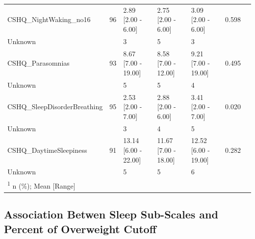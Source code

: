 \documentclass[
]{article}
\begin{document}
\begin{table}[!h]
\begin{tabular}[t]{lllllll}
CSHQ\_NightWaking\_no16 & 96 & 2.89 [2.00 - 6.00] & 2.75 [2.00 - 6.00] & 3.09 [2.00 - 6.00] & 0.598 & \\
\hspace{1em}Unknown &  & 3 & 5 & 3 &  & \\
CSHQ\_Parasomnias & 93 & 8.67 [7.00 - 19.00] & 8.58 [7.00 - 12.00] & 9.21 [7.00 - 19.00] & 0.495 & \\
\addlinespace
\hspace{1em}Unknown &  & 5 & 5 & 4 &  & \\
CSHQ\_SleepDisorderBreathing & 95 & 2.53 [2.00 - 7.00] & 2.88 [2.00 - 6.00] & 3.41 [2.00 - 7.00] & 0.020 & \\
\hspace{1em}Unknown &  & 3 & 4 & 5 &  & \\
CSHQ\_DaytimeSleepiness & 91 & 13.14 [6.00 - 22.00] & 11.67 [7.00 - 18.00] & 12.52 [6.00 - 19.00] & 0.282 & \\
\hspace{1em}Unknown &  & 5 & 5 & 6 &  & \\
\bottomrule
\multicolumn{7}{l}{\rule{0pt}{1em}\textsuperscript{1} n (\%); Mean [Range]}\\
\end{tabular}
\end{table}

\FloatBarrier

\hypertarget{association-betwen-sleep-sub-scales-and-percent-of-overweight-cutoff}{%
\subsection{Association Betwen Sleep Sub-Scales and Percent of
Overweight
Cutoff}\label{association-betwen-sleep-sub-scales-and-percent-of-overweight-cutoff}}
\end{document}
